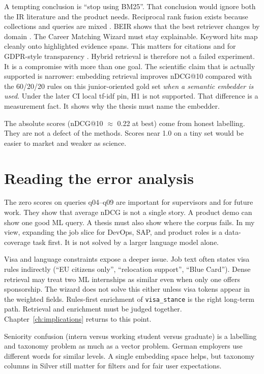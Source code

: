 A tempting conclusion is ``stop using BM25''. That conclusion would ignore both the IR literature and the product needs. Reciprocal rank fusion exists because collections and queries are mixed . BEIR shows that the best retriever changes by domain . The Career Matching Wizard must stay explainable. Keyword hits map cleanly onto highlighted evidence spans. This matters for citations and for GDPR-style transparency . Hybrid retrieval is therefore not a failed experiment. It is a compromise with more than one goal. The scientific claim that is actually supported is narrower: embedding retrieval improves nDCG@10 compared with the 60/20/20 rules on this junior-oriented gold set \emph{when a semantic embedder is used}. Under the later CI local tf-idf pin, H1 is not supported. That difference is a measurement fact. It shows why the thesis must name the embedder.

The absolute scores (nDCG@10 $\approx$ 0.22 at best) come from honest labelling. They are not a defect of the methods. Scores near 1.0 on a tiny set would be easier to market and weaker as science.

\section{Reading the error analysis}
\label{sec:error-discussion}

The zero scores on queries q04--q09 are important for supervisors and for future work. They show that average nDCG is not a single story. A product demo can show one good ML query. A thesis must also show where the corpus fails. In my view, expanding the job slice for DevOps, SAP, and product roles is a data-coverage task first. It is not solved by a larger language model alone.

Visa and language constraints expose a deeper issue. Job text often states visa rules indirectly (``EU citizens only'', ``relocation support'', ``Blue Card''). Dense retrieval may treat two ML internships as similar even when only one offers sponsorship. The wizard does not solve this either unless visa tokens appear in the weighted fields. Rules-first enrichment of \texttt{visa\_stance} is the right long-term path. Retrieval and enrichment must be judged together. Chapter~\ref{ch:implications} returns to this point.

Seniority confusion (intern versus working student versus graduate) is a labelling and taxonomy problem as much as a vector problem. German employers use different words for similar levels. A single embedding space helps, but taxonomy columns in Silver still matter for filters and for fair user expectations.

